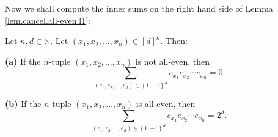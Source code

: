 Now we shall compute the inner sums on the right hand side of Lemma
\ref{lem.cancel.all-even.l1}:

\begin{lemma}
\label{lem.cancel.all-even.l2}Let $n,d\in\mathbb{N}$. Let $\left(  x_{1}%
,x_{2},\ldots,x_{n}\right)  \in\left[  d\right]  ^{n}$. Then: \medskip

\textbf{(a)} If the $n$-tuple $\left(  x_{1},x_{2},\ldots,x_{n}\right)  $ is
not all-even\footnotemark, then%
\[
\sum_{\left(  e_{1},e_{2},\ldots,e_{d}\right)  \in\left\{  1,-1\right\}  ^{d}%
}e_{x_{1}}e_{x_{2}}\cdots e_{x_{n}}=0.
\]


\textbf{(b)} If the $n$-tuple $\left(  x_{1},x_{2},\ldots,x_{n}\right)  $ is
all-even, then%
\[
\sum_{\left(  e_{1},e_{2},\ldots,e_{d}\right)  \in\left\{  1,-1\right\}  ^{d}%
}e_{x_{1}}e_{x_{2}}\cdots e_{x_{n}}=2^{d}.
\]

\end{lemma}


